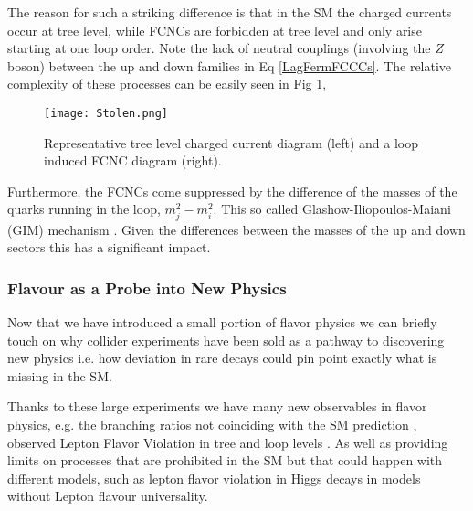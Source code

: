 \setlength{\tabcolsep}{6pt} %
\renewcommand{\arraystretch}{1} %

The reason for such a striking difference is that in the SM the charged currents occur at tree level, while FCNCs are forbidden at tree level and only arise starting at one loop order. Note the lack of neutral couplings (involving the $Z$ boson) between the up and down families in Eq \ref{LagFermFCCCs}. The relative complexity of these processes can be easily seen in Fig \ref{fig:Flavour_D_1},
%
\begin{figure}[H]
	\centering
	\texttt{[image: Stolen.png]}
	\caption{Representative tree level charged current diagram (left) and a loop induced FCNC diagram (right).}
	\label{fig:Flavour_D_1}
\end{figure}
%
%
Furthermore, the FCNCs come suppressed by the difference of the masses of the quarks running in the loop, $m^2_j-m^2_i$. This so called Glashow-Iliopoulos-Maiani (GIM) mechanism \cite{glashow1970weak}. Given the differences between the masses of the up and down sectors this has a significant impact. 
%

\subsubsection{Flavour as a Probe into New Physics}

Now that we have introduced a small portion of flavor physics we can briefly touch on why collider experiments have been sold as a pathway to discovering new physics i.e. how deviation in rare decays could pin point exactly what is missing in the SM. 

Thanks to these large experiments we have many new observables in flavor physics, e.g. the branching ratios not coinciding with the SM prediction \cite{CasteloBranco2014}, observed Lepton Flavor Violation in tree and loop levels \cite{Graverini2019}.
%
As well as providing limits on processes that are prohibited in the SM but that could happen with different models, such as lepton flavor violation in Higgs decays \cite{Sirunyan_2018} in models without Lepton flavour universality. 
%
%

